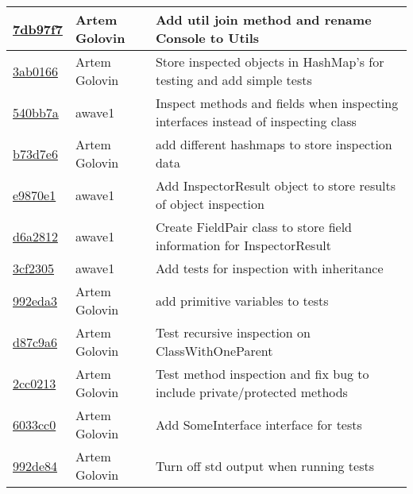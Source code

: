 \begin{tabularx}{\textwidth}{l l X}
\href{https://github.com/awave1/assessment-loan-system/commit/7db97f7b2600395c9b0ee1cbd8e1a8dbabeb5f06}{7db97f7} & Artem Golovin & Add util join method and rename Console to Utils\\ \hline
\href{https://github.com/awave1/assessment-loan-system/commit/3ab0166b0c6bcba1fb7351f428c1eb30311bf4bc}{3ab0166} & Artem Golovin & Store inspected objects in HashMap's for testing and add simple tests\\ \hline
\href{https://github.com/awave1/assessment-loan-system/commit/540bb7a99b2b6281e3c70237ad770311a633bfb9}{540bb7a} & awave1 & Inspect methods and fields when inspecting interfaces instead of inspecting class\\ \hline
\href{https://github.com/awave1/assessment-loan-system/commit/b73d7e66fd35fda567d401dfe5d5cb7afcc3a6e1}{b73d7e6} & Artem Golovin & add different hashmaps to store inspection data\\ \hline
\href{https://github.com/awave1/assessment-loan-system/commit/e9870e193e943079829666047ab28577e3f36f5d}{e9870e1} & awave1 & Add InspectorResult object to store results of object inspection\\ \hline
\href{https://github.com/awave1/assessment-loan-system/commit/d6a2812c427a7c4fe80afba2fa551b98b55d9d1c}{d6a2812} & awave1 & Create FieldPair class to store field information for InspectorResult\\ \hline
\href{https://github.com/awave1/assessment-loan-system/commit/3cf2305bafbcd57ebdd8c5777dd9d438601f6f3f}{3cf2305} & awave1 & Add tests for inspection with inheritance\\ \hline
\href{https://github.com/awave1/assessment-loan-system/commit/992eda3ee69738ed6c845e9ed27b29a375acab12}{992eda3} & Artem Golovin & add primitive variables to tests\\ \hline
\href{https://github.com/awave1/assessment-loan-system/commit/d87c9a622b308a8f602daf11d50ef403aa514d6b}{d87c9a6} & Artem Golovin & Test recursive inspection on ClassWithOneParent\\ \hline
\href{https://github.com/awave1/assessment-loan-system/commit/2cc02136ed850ffcae30fa4ee4a6ac93fd3fc298}{2cc0213} & Artem Golovin & Test method inspection and fix bug to include private/protected methods\\ \hline
\href{https://github.com/awave1/assessment-loan-system/commit/6033cc05036e5672d4463d26b2c790fa28b9f3d1}{6033cc0} & Artem Golovin & Add SomeInterface interface for tests\\ \hline
\href{https://github.com/awave1/assessment-loan-system/commit/992de84b26ebd8ff617c07ba1faa6c01e31d2418}{992de84} & Artem Golovin & Turn off std output when running tests\\ \hline

\end{tabularx}
